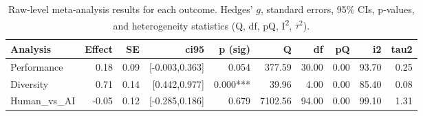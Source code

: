 \begin{table}[H]
\centering
\begin{tabular}{lrrrrrrrrr}
  \toprule
Analysis & Effect & SE & ci95 & p (sig) & Q & df & pQ & i2 & tau2 \\ 
  \midrule
Performance & 0.18 & 0.09 & [-0.003,0.363] & 0.054 & 377.59 & 30.00 & 0.00 & 93.70 & 0.25 \\ 
  Diversity & 0.71 & 0.14 & [0.442,0.977] & 0.000*** & 39.96 & 4.00 & 0.00 & 85.40 & 0.08 \\ 
  Human\_vs\_AI & -0.05 & 0.12 & [-0.285,0.186] & 0.679 & 7102.56 & 94.00 & 0.00 & 99.10 & 1.31 \\ 
   \bottomrule
\end{tabular}
\caption{Raw‐level meta‐analysis results for each outcome. Hedges’ $g$, standard errors, 95\% CIs, p‐values, and heterogeneity statistics (Q, df, pQ, I\textsuperscript{2}, $\tau^2$).} 
\label{tab:meta_raw}
\end{table}
